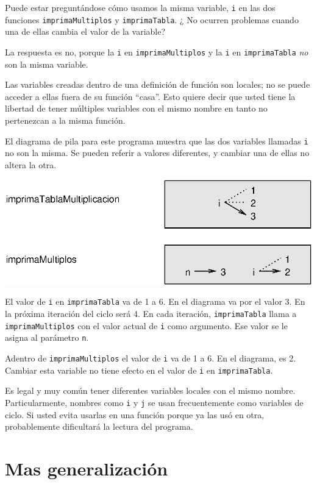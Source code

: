 Puede estar preguntándose cómo usamos la misma variable, \texttt{i} en 
las dos funciones \texttt{imprimaMultiplos} y \texttt{imprimaTabla}. ¿ No ocurren problemas cuando una de ellas cambia el valor de la variable?

La respuesta es no, porque la  \texttt{i} en \texttt{imprimaMultiplos} y la
\texttt{i} en \texttt{imprimaTabla} {\em no} son la misma variable.

Las variables creadas dentro de una definición de función son locales; no
se puede acceder a ellas fuera de su función  ``casa''.  Esto quiere
decir que usted tiene la libertad de tener múltiples variables con 
el mismo nombre en tanto no pertenezcan a la misma función.

El diagrama de pila para este programa muestra que las dos
variables llamadas \texttt{i} no son la misma.  Se pueden referir a
valores diferentes, y cambiar una de ellas no altera la otra.

\beforefig
\centerline{\includegraphics{illustrations/stack4.eps}}
\afterfig

El valor de \texttt{i} en \texttt{imprimaTabla} va de 1 a 6.  
En el diagrama va por el valor 3.  En la próxima iteración del ciclo será 4.  
En cada iteración, \texttt{imprimaTabla} llama a 
\texttt{imprimaMultiplos} con el valor actual de  \texttt{i} como
argumento.  Ese valor se le asigna al parámetro \texttt{n}.

Adentro de  \texttt{imprimaMultiplos} el valor de \texttt{i} va de
1 a 6.  En el diagrama, es 2.  Cambiar esta variable
no tiene efecto en el valor de  \texttt{i} en \texttt{imprimaTabla}.

Es legal y muy común tener diferentes variables locales con el mismo
nombre. Particularmente, nombres como  \texttt{i} y \texttt{j} se usan
frecuentemente como variables de ciclo. Si usted evita
usarlas en una función porque ya las usó en otra, probablemente
dificultará la lectura del programa.


\section{Mas generalización}

